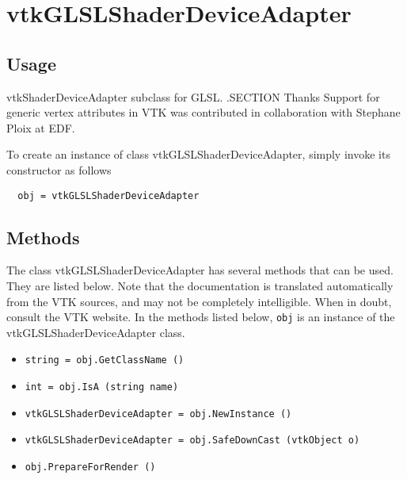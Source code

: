 \section{vtkGLSLShaderDeviceAdapter}

\subsection{Usage}

 vtkShaderDeviceAdapter subclass for GLSL.
 .SECTION Thanks
 Support for generic vertex attributes in VTK was contributed in
 collaboration with Stephane Ploix at EDF.

To create an instance of class vtkGLSLShaderDeviceAdapter, simply
invoke its constructor as follows
\begin{verbatim}
  obj = vtkGLSLShaderDeviceAdapter
\end{verbatim}
\subsection{Methods}

The class vtkGLSLShaderDeviceAdapter has several methods that can be used.
  They are listed below.
Note that the documentation is translated automatically from the VTK sources,
and may not be completely intelligible.  When in doubt, consult the VTK website.
In the methods listed below, \verb|obj| is an instance of the vtkGLSLShaderDeviceAdapter class.
\begin{itemize}
\item  \verb|string = obj.GetClassName ()|

\item  \verb|int = obj.IsA (string name)|

\item  \verb|vtkGLSLShaderDeviceAdapter = obj.NewInstance ()|

\item  \verb|vtkGLSLShaderDeviceAdapter = obj.SafeDownCast (vtkObject o)|

\item  \verb|obj.PrepareForRender ()|

\end{itemize}
